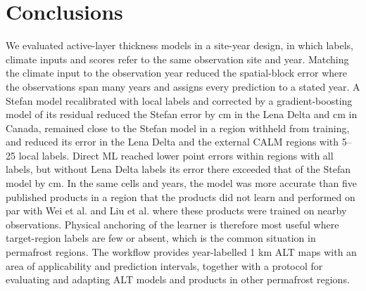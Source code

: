 \section{Conclusions}\label{sec:conclusions}
We evaluated active-layer thickness models in a site-year design, in which labels, climate inputs and scores refer to the same observation site and year. Matching the climate input to the observation year reduced the spatial-block error where the observations span many years and assigns every prediction to a stated year. A Stefan model recalibrated with local labels and corrected by a gradient-boosting model of its residual reduced the Stefan error by \ndrefLeblkRoabs{} cm in the Lena Delta and \ndrefCablkRoabs{} cm in Canada, remained close to the Stefan model in a region withheld from training, and reduced its error in the Lena Delta and the external CALM regions with 5--25 local labels. Direct ML reached lower point errors within regions with all labels, but without Lena Delta labels its error there exceeded that of the Stefan model by \ndrefLeregDzabs{} cm. In the same cells and years, the model was more accurate than five published products in a region that the products did not learn and performed on par with Wei et al. and Liu et al. where these products were trained on nearby observations. Physical anchoring of the learner is therefore most useful where target-region labels are few or absent, which is the common situation in permafrost regions. The workflow provides year-labelled 1 km ALT maps with an area of applicability and prediction intervals, together with a protocol for evaluating and adapting ALT models and products in other permafrost regions.
